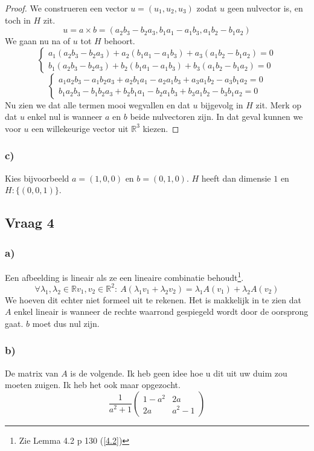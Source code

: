 \documentclass[lineaire_algebra_oplossingen.tex]{subfiles}
\begin{document}
\begin{proof}
We construeren een vector $u = (u_1,u_2,u_3)$ zodat $u$ geen nulvector is, en toch in $H$ zit.
\[
u = a \times b =
(a_2b_3-b_2a_3, b_1a_1-a_1b_3, a_1b_2-b_1a_2)
\]
We gaan nu na of $u$ tot $H$ behoort.
\[
\left\{
\begin{array}{c}
a_1(a_2b_3-b_2a_3) + a_2(b_1a_1-a_1b_3) + a_3(a_1b_2-b_1a_2) = 0\\
b_1(a_2b_3-b_2a_3) + b_2(b_1a_1-a_1b_3) + b_3(a_1b_2-b_1a_2) = 0
\end{array}
\right.
\]
\[
\left\{
\begin{array}{c}
a_1a_2b_3-a_1b_2a_3 + a_2b_1a_1-a_2a_1b_3 + a_3a_1b_2-a_3b_1a_2 = 0\\
b_1a_2b_3-b_1b_2a_3 + b_2b_1a_1-b_2a_1b_3 + b_3a_1b_2-b_3b_1a_2 = 0
\end{array}
\right.
\]
Nu zien we dat alle termen mooi wegvallen en dat $u$ bijgevolg in $H$ zit. Merk op dat $u$ enkel nul is wanneer $a$ en $b$ beide nulvectoren zijn. In dat geval kunnen we voor $u$ een willekeurige vector uit $\mathbb{R}^3$ kiezen.
\end{proof}

\subsubsection*{c)}
Kies bijvoorbeeld $a= (1,0,0)$ en $b=(0,1,0)$. $H$ heeft dan dimensie $1$ en $H : \{(0,0,1)\}$.

\subsection{Vraag 4}
\subsubsection*{a)}
Een afbeelding is lineair als ze een lineaire combinatie behoudt\footnote{Zie Lemma 4.2 p 130 (\ref{4.2})}.
\[
\forall \lambda_1,\lambda_2 \in \mathbb{R} v_1,v_2 \in \mathbb{R}^{2}:\  A(\lambda_1v_1+\lambda_2v_2) = \lambda_1A(v_1)+\lambda_2A(v_2)
\]
We hoeven dit echter niet formeel uit te rekenen. Het is makkelijk in te zien dat $A$ enkel lineair is wanneer de rechte waarrond gespiegeld wordt door de oorsprong gaat. $b$ moet dus nul zijn.

\subsubsection*{b)}
De matrix van $A$ is de volgende. Ik heb geen idee hoe u dit uit uw duim zou moeten zuigen. Ik heb het ook maar opgezocht.
\[
\frac{1}{a^2 + 1}
\begin{pmatrix}
1-a^2 & 2a\\
2a & a^2-1
\end{pmatrix}
\]
\end{document}
